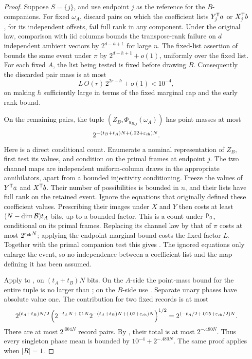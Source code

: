 \begin{proof}
Suppose \(S=\{j\}\), and use endpoint \(j\) as the reference
for the \(B\)-companions.  For fixed \(\omega_A\), discard
pairs on which the coefficient lists
\(Y_j^{\mathsf T} a\) or \(X_j^{\mathsf T} b\), for its independent offsets,
fail full rank in any component.  Under the original law, comparison with iid columns bounds the
transpose-rank failure on \(d\) independent ambient vectors by
\(2^{d-h+1}\) for large \(n\).  The fixed-list assertion of
 bounds the same event under \(\pi\)
by \(2^{d-h+1}+o(1)\), uniformly over the fixed list.  For each
fixed \(A\), the list being tested is fixed before drawing \(B\).
Consequently the discarded pair mass is at most
\[
 L\,O(r)\,2^{2r-h}+o(1)<10^{-4},
\]
on making \(h\) sufficiently large in terms of the fixed marginal
cap and the early rank bound.

On the remaining pairs, the tuple
\((Z_B,\Phi_{u_{B,j}}(\omega_A))\) has point masses at most
\begin{equation}
 2^{-(t_B+t_A)N+(.02+\varepsilon_{\rm ch})N}.
 \label{eq:singleton-joint-pmax}
\end{equation}
Here is a direct conditional count.  Enumerate a nominal
representation of \(Z_B\), first test its values, and condition
on the primal frames at endpoint \(j\).  The two channel maps
are independent uniform-column draws in the appropriate
annihilators, apart from a bounded injectivity conditioning.
Freeze the values of \(Y^{\mathsf T} a\) and \(X^{\mathsf T} b\).  Their
number of possibilities is bounded in \(n\), and their lists
have full rank on the retained event.  Ignore the equations
that originally defined these coefficient values.  Prescribing
their images under \(X\) and \(Y\) then costs at least
\((N-\dim\mathcal B)t_A\) bits, up to a bounded factor.
This is a count under \({\mathsf P_0}\), conditional on its primal
frames.  Replacing its channel law by that of \(\pi\) costs at
most \(2^{\varepsilon_{\rm ch}N}\); applying the endpoint marginal
bound costs the fixed factor \(L\).  Together with the primal
companion test this gives .  The ignored equations only
enlarge the event, so no independence between a coefficient
list and the map defining it has been assumed.

Apply  to , on
\((t_A+t_B)N\) bits.  On the \(A\)-side the point-mass bound for
the entire tuple is no larger than
; on the \(B\)-side use
.  Separate unary phases have
absolute value one.  The contribution for two fixed records is
at most
\[
 2^{(t_A+t_B)N/2}
 \left(2^{-t_AN+.01N}
       2^{-(t_A+t_B)N+(.02+\varepsilon_{\rm ch})N}\right)^{1/2}
 =2^{(-t_A/2+.015+\varepsilon_{\rm ch}/2)N}.
 \]
There are at most \(2^{.004N}\) record pairs.  By
, their total is at most \(2^{-.480N}\).
Thus every singleton phase mean is bounded by
\(10^{-4}+2^{-.480N}\).  The same proof applies when
\(|R|=1\).


\end{proof}
